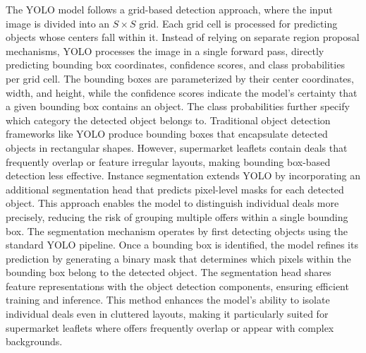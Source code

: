 \documentclass[11pt]{article}
\begin{document}
The YOLO model follows a grid-based detection approach, where the input image is divided into an $S \times S$ grid. Each grid cell is processed for predicting objects whose centers fall within it. Instead of relying on separate region proposal mechanisms, YOLO processes the image in a single forward pass, directly predicting bounding box coordinates, confidence scores, and class probabilities per grid cell. The bounding boxes are parameterized by their center coordinates, width, and height, while the confidence scores indicate the model's certainty that a given bounding box contains an object. The class probabilities further specify which category the detected object belongs to. Traditional object detection frameworks like YOLO produce bounding boxes that encapsulate detected objects in rectangular shapes. However, supermarket leaflets contain deals that frequently overlap or feature irregular layouts, making bounding box-based detection less effective. Instance segmentation extends YOLO by incorporating an additional segmentation head that predicts pixel-level masks for each detected object. This approach enables the model to distinguish individual deals more precisely, reducing the risk of grouping multiple offers within a single bounding box. The segmentation mechanism operates by first detecting objects using the standard YOLO pipeline. Once a bounding box is identified, the model refines its prediction by generating a binary mask that determines which pixels within the bounding box belong to the detected object. The segmentation head shares feature representations with the object detection components, ensuring efficient training and inference. This method enhances the model's ability to isolate individual deals even in cluttered layouts, making it particularly suited for supermarket leaflets where offers frequently overlap or appear with complex backgrounds.
\end{document}
